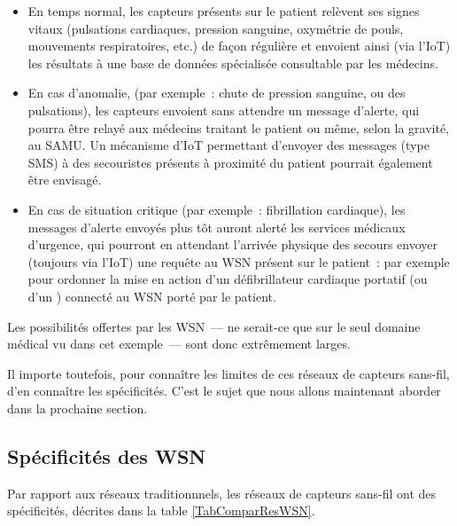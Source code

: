 \begin{itemize}

\item En temps normal, les capteurs présents sur le patient relèvent
ses signes vitaux (pulsations cardiaques, pression sanguine, oxymétrie
de pouls, mouvements respiratoires, etc.) de façon régulière et
envoient ainsi (via l'IoT) les résultats à une base de données
spécialisée consultable par les médecins.

\item En cas d'anomalie, (par exemple~: chute de pression sanguine,
ou des pulsations), les capteurs envoient sans attendre un message
d'alerte, qui pourra être relayé aux médecins traitant le patient
ou même, selon la gravité, au SAMU. Un mécanisme d'IoT permettant
d'envoyer des messages (type SMS) à des secouristes présents à
proximité du patient pourrait également être envisagé.

\item En cas de situation critique (par exemple~: fibrillation
cardiaque), les messages d'alerte envoyés plus tôt auront alerté
les services médicaux d'urgence, qui pourront en attendant l'arrivée
physique des secours envoyer (toujours via l'IoT) une requête au WSN
présent sur le patient~: par exemple pour ordonner la mise en action
d'un défibrillateur cardiaque portatif (ou d'un )
connecté au WSN porté par le patient.

\end{itemize}

Les possibilités offertes par les WSN~--- ne serait-ce que sur le seul
domaine médical vu dans cet exemple~--- sont donc extrêmement larges.

Il importe toutefois, pour connaître les limites de ces réseaux
de capteurs sans-fil, d'en connaître les spécificités. C'est le
sujet que nous allons maintenant aborder dans la prochaine section.


\subsection{Spécificités des WSN}
\label{SubsecSpecifWSN}

Par rapport aux réseaux traditionnnels, les réseaux de capteurs sans-fil
ont des spécificités, décrites dans la table \vref{TabComparResWSN}.

